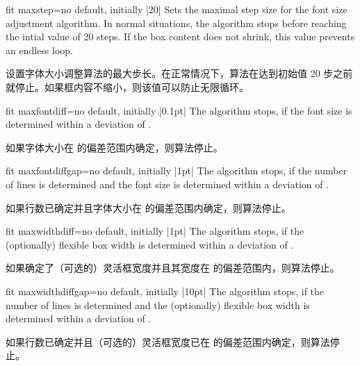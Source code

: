\begin{docTcbKey}{fit maxstep}{=}{no default, initially |20|}
Sets the maximal step size for the font size adjustment algorithm.
In normal situations, the algorithm stops before reaching the intial value of 20 steps.
If the box content does not shrink, this value prevents an endless loop.

设置字体大小调整算法的最大步长。在正常情况下，算法在达到初始值 20 步之前就停止。如果框内容不缩小，则该值可以防止无限循环。
\end{docTcbKey}

 

\begin{docTcbKey}{fit maxfontdiff}{=}{no default, initially |0.1pt|}
The algorithm stops, if the font size is determined within a deviation of
.

如果字体大小在  的偏差范围内确定，则算法停止。
\end{docTcbKey}


\begin{docTcbKey}{fit maxfontdiffgap}{=}{no default, initially |1pt|}
The algorithm stops, if the number of lines is determined and the font size is
determined within a deviation of .

如果行数已确定并且字体大小在  的偏差范围内确定，则算法停止。
\end{docTcbKey}


\begin{docTcbKey}{fit maxwidthdiff}{=}{no default, initially |1pt|}
The algorithm stops, if the (optionally) flexible box width
is determined within a deviation of .

如果确定了（可选的）灵活框宽度并且其宽度在  的偏差范围内，则算法停止。
\end{docTcbKey}


\begin{docTcbKey}{fit maxwidthdiffgap}{=}{no default, initially |10pt|}
The algorithm stops, if the number of lines is determined and the (optionally) flexible box width
is determined within a deviation of .

如果行数已确定并且（可选的）灵活框宽度已在  的偏差范围内确定，则算法停止。
\end{docTcbKey}


